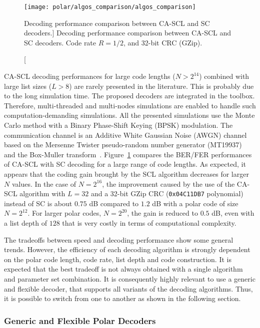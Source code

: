 \begin{figure}[htp]
  \centering
  \texttt{[image: polar/algos\_comparison/algos\_comparison]}
  \caption
    [Decoding performance comparison between CA-SCL and SC decoders.]
    {Decoding performance comparison between CA-SCL and SC decoders.
    Code rate $R = 1/2$, and 32-bit CRC (GZip).}
  \label{plot:polar_algos_comparison}
\end{figure}

CA-SCL decoding performances for large code lengths ($N > 2^{14}$) combined with
large list sizes ($L > 8$) are rarely presented in the literature. This is
probably due to the long simulation time. The proposed decoders are integrated
in the \AFFECT toolbox. Therefore, multi-threaded and multi-nodes simulations
are enabled to handle such computation-demanding simulations. All the presented
simulations use the Monte Carlo method with a Binary Phase-Shift Keying (BPSK)
modulation. The communication channel is an Additive White Gaussian Noise (AWGN)
channel based on the Mersenne Twister pseudo-random number generator
(MT19937)~\cite{Matsumoto1998} and the Box-Muller transform~\cite{Box1958}.
Figure~\ref{plot:polar_algos_comparison} compares the BER/FER performances of
CA-SCL with SC decoding for a large range of code lengths. As expected, it
appears that the coding gain brought by the SCL algorithm decreases for larger
$N$ values. In the case of $N=2^{16}$, the improvement caused by the use of the
CA-SCL algorithm with $L=32$ and a 32-bit GZip CRC (\verb|0x04C11DB7|
polynomial) instead of SC is about $0.75$ dB compared to $1.2$ dB with a polar
code of size $N=2^{12}$. For larger polar codes, $N=2^{20}$, the gain is reduced
to $0.5$ dB, even with a list depth of $128$ that is very costly in terms of
computational complexity.

The tradeoffs between speed and decoding performance show some general trends.
However, the efficiency of each decoding algorithm is strongly dependent on the
polar code length, code rate, list depth and code construction. It is expected
that the best tradeoff is not always obtained with a single algorithm and
parameter set combination. It is consequently highly relevant to use a generic
and flexible decoder, that supports all variants of the decoding algorithms.
Thus, it is possible to switch from one to another as shown in the following
section.

\subsubsection{Generic and Flexible Polar Decoders}
\label{sec:polar_genericity}

